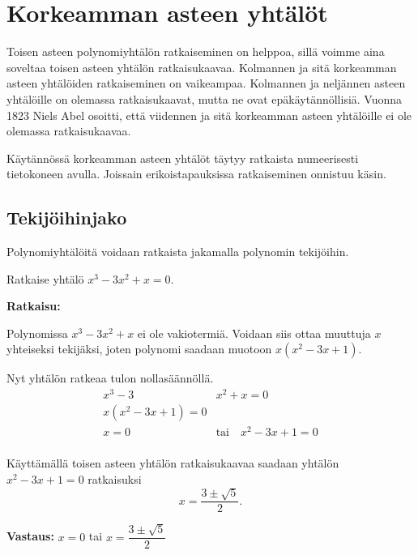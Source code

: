 \section{Korkeamman asteen yhtälöt}



Toisen asteen polynomiyhtälön ratkaiseminen on helppoa, sillä voimme aina soveltaa toisen asteen yhtälön ratkaisukaavaa.
Kolmannen ja sitä korkeamman asteen yhtälöiden ratkaiseminen on vaikeampaa.
Kolmannen ja neljännen asteen yhtälöille on olemassa ratkaisukaavat, mutta ne ovat epäkäytännöllisiä.
Vuonna 1823 Niels Abel osoitti, että viidennen ja sitä korkeamman asteen yhtälöille ei ole olemassa ratkaisukaavaa.

Käytännössä korkeamman asteen yhtälöt täytyy ratkaista numeerisesti tietokoneen avulla. Joissain erikoistapauksissa ratkaiseminen onnistuu käsin.

\subsection*{Tekijöihinjako}

Polynomiyhtälöitä voidaan ratkaista jakamalla polynomin tekijöihin.


\begin{esimerkki}
Ratkaise yhtälö $x^3 - 3x^2 + x = 0$.

\textbf{Ratkaisu:}

Polynomissa $x^3 - 3x^2 + x$ ei ole vakiotermiä. Voidaan siis ottaa muuttuja $x$ yhteiseksi tekijäksi, joten polynomi saadaan muotoon $x(x^2 - 3x + 1)$. 

Nyt yhtälön ratkeaa tulon nollasäännöllä.
\begin{align*}
x^3 - 3&x^2 + x=0 \\
x(x^2 - 3x + 1)=0 \\
x= 0 \quad &\text{tai} \quad x^2 - 3x + 1 = 0 \\
\end{align*}

Käyttämällä toisen asteen yhtälön ratkaisukaavaa saadaan yhtälön $x^2 - 3x + 1 = 0$ ratkaisuksi
\[x = \frac{3\pm \sqrt{5}}{2}.\]

\textbf{Vastaus:}
$x= 0$ tai $x=\dfrac{3\pm \sqrt{5}}{2}$
\end{esimerkki}

